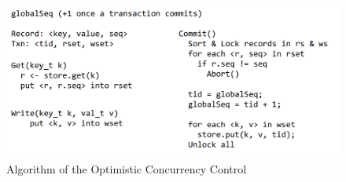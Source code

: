 \begin{figure}
    \centering
    \includegraphics[width=0.36\paperwidth]{figure/algorithm.png}
    \caption{Algorithm of the Optimistic Concurrency Control}
    \label{fig:OCCValidation}
\end{figure}